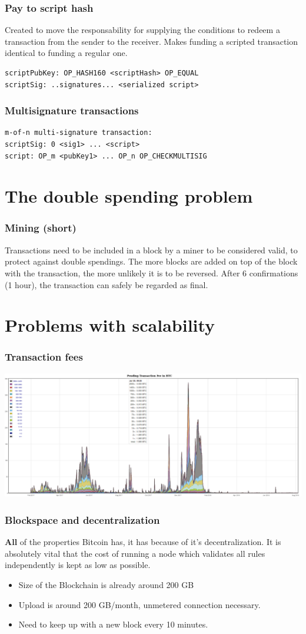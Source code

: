 \documentclass{beamer}
\begin{document}
\begin{frame}[fragile]
\frametitle{Pay to script hash}
Created to move the responsability for supplying the conditions to 
redeem a transaction from the sender to the receiver. Makes funding a scripted transaction identical to funding a regular one.
\begin{verbatim}
scriptPubKey: OP_HASH160 <scriptHash> OP_EQUAL 
scriptSig: ..signatures... <serialized script>
\end{verbatim}
\end{frame}
\begin{frame}[fragile]
\frametitle{Multisignature transactions}
\begin{verbatim}
m-of-n multi-signature transaction:
scriptSig: 0 <sig1> ... <script>
script: OP_m <pubKey1> ... OP_n OP_CHECKMULTISIG
\end{verbatim}
\end{frame}
\section{The double spending problem}
\begin{frame}
\frametitle{Mining (short)}
Transactions need to be included in a block by a miner to be considered valid, to protect against double spendings. The more blocks are added  on top of the block with the transaction, the more unlikely it is to be reversed. After 6 confirmations (1 hour), the transaction can safely be regarded as final.
\end{frame}
\section{Problems with scalability}
\begin{frame}
\frametitle{Transaction fees}
\includegraphics[scale=0.25]{images/fees.png}
\end{frame}
\begin{frame}
\frametitle{Blockspace and decentralization}
\textbf{All} of the properties Bitcoin has, it has because of it's decentralization. It is absolutely vital that the cost of running a node which validates all rules independently is kept as low as possible.
\begin{itemize}
\item Size of the Blockchain is already around 200 GB
\item Upload is around 200 GB/month, unmetered connection necessary.
\item Need to keep up with a new block every 10 minutes.
\end{itemize}
\end{frame}
\end{document}
